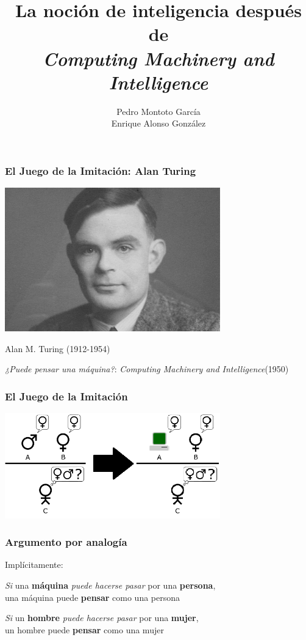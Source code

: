 \documentclass{beamer}
\title[Intelligence after CMI]{La noción de inteligencia después de\\ \textit{Computing Machinery and Intelligence}} %
\author{Pedro Montoto García\\Enrique Alonso González} %
\institute[USC]{Universidade de Santiago de Compostela}
\date{}
\begin{document}
\begin{frame}
\titlepage %
\end{frame}

\begin{frame}
	\frametitle{El Juego de la Imitación: Alan Turing}
\begin{center}
    \includegraphics[width=0.7\textwidth]{turing}
    
    Alan M. Turing (1912-1954)
   
    \textit{¿Puede pensar una máquina?}: \textit{Computing Machinery and Intelligence}(1950)	
    
    
\end{center}
\end{frame}

\begin{frame}
	\frametitle{El Juego de la Imitación}
\begin{center}
    \includegraphics[width=0.7\textwidth]{imitation_game}
\end{center}
\end{frame}


\begin{frame}
\frametitle{Argumento por analogía}

Implícitamente:

\begin{center}
\textit{Si} una \textbf{máquina} \textit{puede hacerse pasar} por una \textbf{persona}, \\ una máquina puede \textbf{pensar} como una persona

\hfill
\hfill
\hfill
\hfill

\scalebox{3}{$\Uparrow$}

\hfill
\hfill
\hfill
\hfill

\textit{Si} un \textbf{hombre} \textit{puede hacerse pasar} por una \textbf{mujer}, \\ un hombre puede \textbf{pensar} como una mujer
\end{center}

\end{frame}
\end{document}
